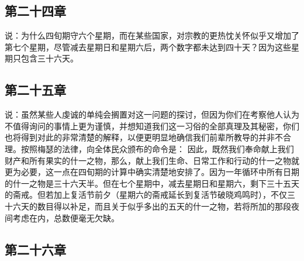 
\subsection{第二十四章}

\par

说：为什么四旬期守六个星期，而在某些国家，对宗教的更热忱关怀似乎又增加了第七个星期，尽管减去星期日和星期六后，两个数字都未达到四十天？因为这些星期只包含三十六天。\par


\subsection{第二十五章}

\par

说：虽然某些人虔诚的单纯会搁置对这一问题的探讨，但因为你们在考察他人认为不值得询问的事情上更为谨慎，并想知道我们这一习俗的全部真理及其秘密，你们也将得到对此的非常清楚的解释，以便更明显地确信我们前辈所教导的并非不合理。按照梅瑟的法律，向全体民众颁布的命令是： 因此，既然我们奉命献上我们财产和所有果实的什一之物，那么，献上我们生命、日常工作和行动的什一之物就更为必要，这一点在四旬期的计算中确实清楚地安排了。因为一年循环中所有日期的什一之物是三十六天半。但在七个星期中，减去星期日和星期六，剩下三十五天的斋戒。但若加上复活节前夕（星期六的斋戒延长到复活节破晓鸡鸣时），不仅三十六天的数目得以补足，而且关于似乎多出的五天的什一之物，若将所加的那段夜间考虑在内，总数便毫无欠缺。\par


\subsection{第二十六章}

\par

